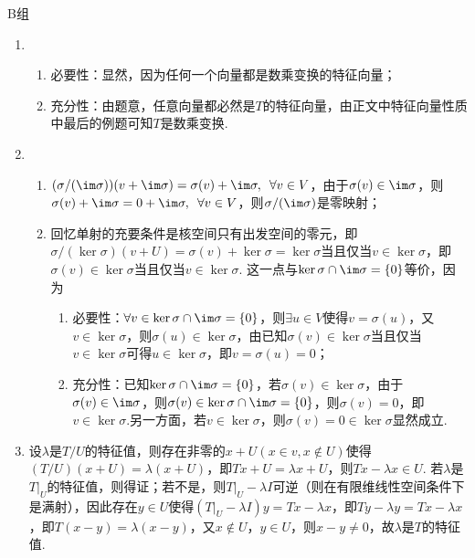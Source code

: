 \centerline{\heiti B组}
\begin{enumerate}
    \item \begin{enumerate}
        \item 必要性：显然，因为任何一个向量都是数乘变换的特征向量；
        \item 充分性：由题意，任意向量都必然是$T$的特征向量，由正文中特征向量性质中最后的例题可知$T$是数乘变换.
    \end{enumerate}

    \item \begin{enumerate}
        \item $(\sigma/(\im\sigma))(v+\im\sigma)=\sigma(v)+\im\sigma,\enspace\forall v\in V$，由于$\sigma(v)\in\im\sigma$，则$\sigma(v)+\im\sigma=0+\im\sigma,\enspace\forall v\in V$，则$\sigma/(\im\sigma)$是零映射；
        \item 回忆单射的充要条件是核空间只有出发空间的零元，即$\sigma/(\ker \sigma)(v+U)=\sigma(v)+\ker\sigma=\ker\sigma$当且仅当$v\in\ker\sigma$，即$\sigma(v)\in\ker\sigma$当且仅当$v\in\ker\sigma$. 这一点与$\ker \sigma\cap\im \sigma=\{0\}$等价，因为
        \begin{enumerate}
            \item 必要性：$\forall v\in\ker \sigma\cap\im \sigma=\{0\}$，则$\exists u\in V$使得$v=\sigma(u)$，又$v\in\ker\sigma$，则$\sigma(u)\in\ker\sigma$，由已知$\sigma(v)\in\ker\sigma$当且仅当$v\in\ker\sigma$可得$u\in\ker\sigma$，即$v=\sigma(u)=0$；
            \item 充分性：已知$\ker \sigma\cap\im \sigma=\{0\}$，若$\sigma(v)\in\ker\sigma$，由于$\sigma(v)\in\im\sigma$，则$\sigma(v)\in\ker\sigma\cap\im\sigma=\{0\}$，则$\sigma(v)=0$，即$v\in\ker\sigma$.另一方面，若$v\in\ker\sigma$，则$\sigma(v)=0\in\ker\sigma$显然成立.
        \end{enumerate}
    \end{enumerate}

    \item 设$\lambda$是$T/U$的特征值，则存在非零的$x+U(x\in v,x\notin U)$使得$(T/U)(x+U)=\lambda(x+U)$，即$Tx+U=\lambda x+U$，则$Tx-\lambda x\in U$. 若$\lambda$是$T\vert_U$的特征值，则得证；若不是，则$T\vert_U-\lambda I$可逆（则在有限维线性空间条件下是满射），因此存在$y\in U$使得$(T\vert_U-\lambda I)y=Tx-\lambda x$，即$Ty-\lambda y=Tx-\lambda x$，即$T(x-y)=\lambda(x-y)$，又$x\notin U$，$y\in U$，则$x-y\neq 0$，故$\lambda$是$T$的特征值.


\end{enumerate}
